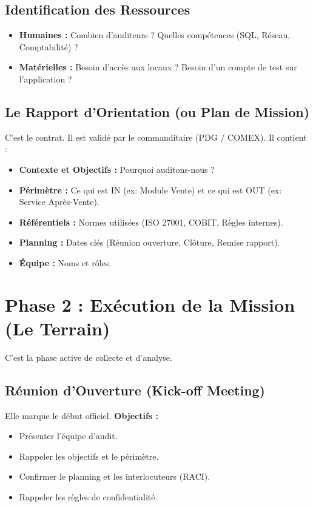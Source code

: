 \subsection{Identification des Ressources}

\begin{itemize}
    \item \textbf{Humaines :} Combien d'auditeurs ? Quelles compétences (SQL, Réseau, Comptabilité) ?
    \item \textbf{Matérielles :} Besoin d'accès aux locaux ? Besoin d'un compte de test sur l'application ?
\end{itemize}

\subsection{Le Rapport d'Orientation (ou Plan de Mission)}

C'est le contrat. Il est validé par le commanditaire (PDG / COMEX). Il contient :
\begin{itemize}
    \item \textbf{Contexte et Objectifs :} Pourquoi auditons-nous ?
    \item \textbf{Périmètre :} Ce qui est IN (ex: Module Vente) et ce qui est OUT (ex: Service Après-Vente).
    \item \textbf{Référentiels :} Normes utilisées (ISO 27001, COBIT, Règles internes).
    \item \textbf{Planning :} Dates clés (Réunion ouverture, Clôture, Remise rapport).
    \item \textbf{Équipe :} Noms et rôles.
\end{itemize}

\section{Phase 2 : Exécution de la Mission (Le Terrain)}

C'est la phase active de collecte et d'analyse.

\subsection{Réunion d'Ouverture (Kick-off Meeting)}

Elle marque le début officiel.
\textbf{Objectifs :}
\begin{itemize}
    \item Présenter l'équipe d'audit.
    \item Rappeler les objectifs et le périmètre.
    \item Confirmer le planning et les interlocuteurs (RACI).
    \item Rappeler les règles de confidentialité.
\end{itemize}

